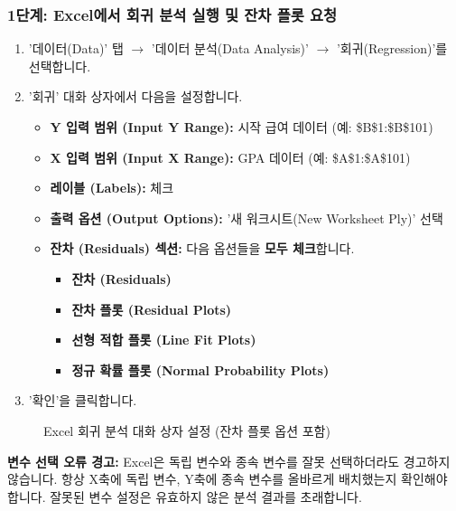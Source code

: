 \documentclass[11pt,a4paper]{book}
\theoremstyle{definition}
\begin{document}
\subsubsection{1단계: Excel에서 회귀 분석 실행 및 잔차 플롯 요청}
\begin{enumerate}
    \item '데이터(Data)' 탭 $\rightarrow$ '데이터 분석(Data Analysis)' $\rightarrow$ '회귀(Regression)'를 선택합니다.
    \item '회귀' 대화 상자에서 다음을 설정합니다.
    \begin{itemize}
        \item \textbf{Y 입력 범위 (Input Y Range):} 시작 급여 데이터 (예: \$B\$1:\$B\$101)
        \item \textbf{X 입력 범위 (Input X Range):} GPA 데이터 (예: \$A\$1:\$A\$101)
        \item \textbf{레이블 (Labels):} 체크
        \item \textbf{출력 옵션 (Output Options):} '새 워크시트(New Worksheet Ply)' 선택
        \item \textbf{잔차 (Residuals) 섹션:} 다음 옵션들을 \textbf{모두 체크}합니다.
        \begin{itemize}
            \item \textbf{잔차 (Residuals)}
            \item \textbf{잔차 플롯 (Residual Plots)}
            \item \textbf{선형 적합 플롯 (Line Fit Plots)}
            \item \textbf{정규 확률 플롯 (Normal Probability Plots)}
        \end{itemize}
    \end{itemize}
    \item '확인'을 클릭합니다.
\end{enumerate}

\begin{figure}[h!]
    \centering
    \caption{Excel 회귀 분석 대화 상자 설정 (잔차 플롯 옵션 포함)}
    \label{fig:gpa_salary_regression_dialog}
\end{figure}

\begin{cautionbox}
\textbf{변수 선택 오류 경고:}
Excel은 독립 변수와 종속 변수를 잘못 선택하더라도 경고하지 않습니다. 항상 X축에 독립 변수, Y축에 종속 변수를 올바르게 배치했는지 확인해야 합니다. 잘못된 변수 설정은 유효하지 않은 분석 결과를 초래합니다.
\end{cautionbox}
\end{document}
